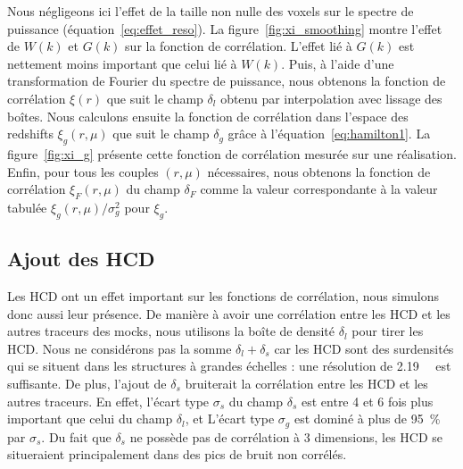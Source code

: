 Nous négligeons ici l'effet de la taille non nulle des voxels sur le spectre de puissance (équation~\ref{eq:effet_reso}).
La figure~\ref{fig:xi_smoothing} montre l'effet de $W(k)$ et $G(k)$ sur la fonction de corrélation. L'effet lié à $G(k)$ est nettement moins important que celui lié à $W(k)$.
Puis, à l'aide d'une transformation de Fourier du spectre de puissance, nous obtenons la fonction de corrélation $\xi(r)$ que suit le champ $\delta_l$ obtenu par interpolation avec lissage des boîtes.
Nous calculons ensuite la fonction de corrélation dans l'espace des redshifts $\xi_g(r, \mu)$ que suit le champ $\delta_g$ grâce à l'équation~\ref{eq:hamilton1}. La figure~\ref{fig:xi_g} présente cette fonction de corrélation mesurée sur une réalisation. Enfin, pour tous les couples $(r,\mu)$ nécessaires, nous obtenons la fonction de corrélation $\xi_F(r, \mu)$ du champ $\delta_F$ comme la valeur correspondante à la valeur tabulée $\xi_g(r, \mu) / \sigma_g^2$ pour $\xi_g$.



\subsection{Ajout des HCD}
\label{subsec:hcd}
Les HCD ont un effet important sur les fonctions de corrélation, nous simulons donc aussi leur présence. De manière à avoir une corrélation entre les HCD et les autres traceurs des mocks, nous utilisons la boîte de densité $\delta_l$ pour tirer les HCD. Nous ne considérons pas la somme $\delta_l + \delta_s$ car les HCD sont des surdensités qui se situent dans les structures à grandes échelles : une résolution de \SI{2.19}{\perh\Mpc} est suffisante. De plus, l'ajout de $\delta_s$ bruiterait la corrélation entre les HCD et les autres traceurs. En effet, l'écart type $\sigma_s$ du champ $\delta_s$ est entre 4 et 6 fois plus important que celui du champ $\delta_l$, et L'écart type $\sigma_g$ est dominé à plus de \SI{95}{\percent} par $\sigma_s$. Du fait que $\delta_s$ ne possède pas de corrélation à 3 dimensions, les HCD se situeraient principalement dans des pics de bruit non corrélés.

